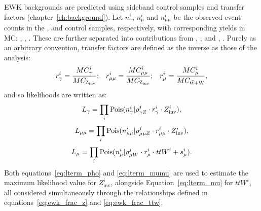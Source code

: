 EWK backgrounds are predicted using sideband control samples and transfer 
factors (chapter~\ref{ch:background}). Let $n_{\gamma}^i$, $n_{\mu}^i$ and
$n_{\mu\mu}^i$ be
the observed event counts in the \gj, \mj and \mmj control samples, 
respectively, with corresponding yields in MC: \mcp, \mcm, \mcmm. These are
further separated into contributions from \zinv, \mczinv, and ,
\mcttw. Purely as an arbitrary convention, transfer factors are defined as
the inverse as those of the analysis:
% 
\begin{equation}
r_{\gamma}^i = \frac{MC_{\gamma}^i}{MC_{\text{Z}_{\text{inv}}}};\;\;\;
r_{\mu\mu}^i = \frac{MC_{\mu\mu}^i}{MC_{\text{Z}_{\text{inv}}}};\;\;\;
r_{\mu}^i = \frac{MC_{\mu}^i}{MC_{\rm{t}\bar{\rm{t}}+\text{W}}},
\end{equation}
% 
and so likelihoods are written as:
% 
\begin{equation}
L_{\gamma} = \prod_i \text{Pois}(n_{\gamma}^i | \rho^j_{\gamma Z} \cdot r^i_{\gamma} \cdot Z^i_{\text{inv}}),
\label{eq:lterm_pho}
\end{equation}
\begin{equation}
L_{\mu\mu} = \prod_i \text{Pois}(n_{\mu\mu}^i | \rho^j_{\mu\mu Z} \cdot r^i_{\mu\mu} \cdot Z^i_{\text{inv}}),
\label{eq:lterm_mumu}
\end{equation}
\begin{equation}
L_{\mu} = \prod_i \text{Pois}(n_{\mu}^i | \rho^j_{\mu W} \cdot r^i_{\mu} \cdot ttW^i + s_{\mu}^i).
\label{eq:lterm_mu}
\end{equation}
% 
Both equations~\ref{eq:lterm_pho} and \ref{eq:lterm_mumu} are used to estimate the 
maximum likelihood value for $Z^i_{\text{inv}}$, alongside Equation~\ref{eq:lterm_mu} 
for $ttW^i$, all considered simultaneously through the relationships defined in
equations~\ref{eq:ewk_frac_z} and \ref{eq:ewk_frac_ttw}.

